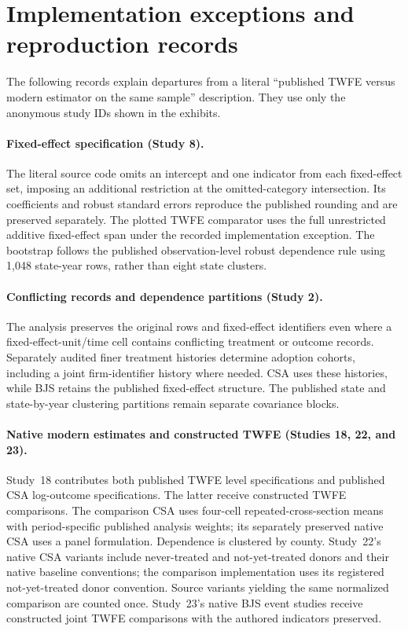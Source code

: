 \documentclass[11pt,letterpaper]{article}
\begin{document}
\section{Implementation exceptions and reproduction records}
\label{app:exceptions}

The following records explain departures from a literal ``published TWFE versus modern estimator on the same sample'' description. They use only the anonymous study IDs shown in the exhibits.

\paragraph{Fixed-effect specification (Study 8).}
The literal source code omits an intercept and one indicator from each fixed-effect set, imposing an additional restriction at the omitted-category intersection. Its coefficients and robust standard errors reproduce the published rounding and are preserved separately. The plotted TWFE comparator uses the full unrestricted additive fixed-effect span under the recorded implementation exception. The bootstrap follows the published observation-level robust dependence rule using 1,048 state-year rows, rather than eight state clusters.

\paragraph{Conflicting records and dependence partitions (Study 2).}
The analysis preserves the original rows and fixed-effect identifiers even where a fixed-effect-unit/time cell contains conflicting treatment or outcome records. Separately audited finer treatment histories determine adoption cohorts, including a joint firm-identifier history where needed. CSA uses these histories, while BJS retains the published fixed-effect structure. The published state and state-by-year clustering partitions remain separate covariance blocks.


\paragraph{Native modern estimates and constructed TWFE (Studies 18, 22, and 23).}
Study~18 contributes both published TWFE level specifications and published CSA log-outcome specifications. The latter receive constructed TWFE comparisons. The comparison CSA uses four-cell repeated-cross-section means with period-specific published analysis weights; its separately preserved native CSA uses a panel formulation. Dependence is clustered by county. Study~22's native CSA variants include never-treated and not-yet-treated donors and their native baseline conventions; the comparison implementation uses its registered not-yet-treated donor convention. Source variants yielding the same normalized comparison are counted once. Study~23's native BJS event studies receive constructed joint TWFE comparisons with the authored indicators preserved.
\end{document}
